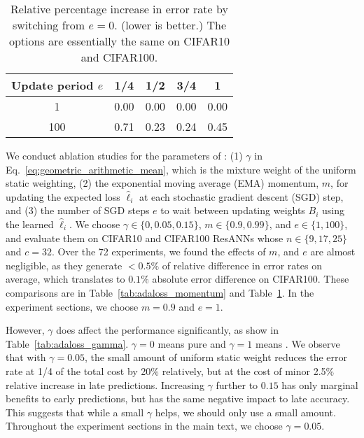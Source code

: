 \begin{table}[h!]
    \centering
    \begin{tabular}{c|cccc}
\hline
Update period $e$ & 1/4 & 1/2 & 3/4 & 1 \\
\hline
1
	&  0.00 &  0.00 &  0.00 &  0.00 \\
100
	&  0.71 &  0.23 &  0.24 &  0.45 \\
\hline
    \end{tabular}
    \caption{Relative percentage increase in error rate by switching from $e=0$.  (lower is better.) The options are essentially the same on CIFAR10 and CIFAR100. }
    \label{tab:adaloss_update_per}
\end{table}

We conduct ablation studies for the parameters of \adaloss: (1) $\gamma$ in Eq.~\ref{eq:geometric_arithmetic_mean}, which is the mixture weight of the uniform static weighting, (2) the exponential moving average (EMA) momentum, $m$, for updating the expected loss $\hat{\ell}_i$ at each stochastic gradient descent (SGD) step, and (3) the number of SGD steps $e$ to wait between updating \adaloss weights $B_i$ using the learned $\hat{\ell}_i$. We choose $\gamma \in \{0, 0.05, 0.15 \}$, $m \in \{0.9, 0.99\}$, and $e \in \{1, 100\}$, and evaluate them on CIFAR10 and CIFAR100 ResANNs whose $n \in \{9,17,25\}$ and $c=32$. Over the 72 experiments, we found the effects of $m$, and $e$ are almost negligible, as they generate $<0.5\%$ of relative difference in error rates on average, which translates to $0.1\%$ absolute error difference on CIFAR100. These comparisons are in Table~\ref{tab:adaloss_momentum} and Table~\ref{tab:adaloss_update_per}. In the experiment sections, we choose $m = 0.9$ and $e=1$.

However,  $\gamma$ does affect the performance significantly, as show in Table~\ref{tab:adaloss_gamma}. $\gamma=0$ means pure \adaloss and $\gamma=1$ means \const. We observe that with $\gamma=0.05$, the small amount of uniform static weight reduces the error rate at 1/4 of the total cost by 20\% relatively, but at the cost of minor 2.5\% relative increase in late predictions. Increasing $\gamma$ further to $0.15$ has only marginal benefits to early predictions, but has the same negative impact to late accuracy. This suggests that while a small $\gamma$ helps, we should only use a small amount. Throughout the experiment sections in the main text, we choose $\gamma = 0.05$.


